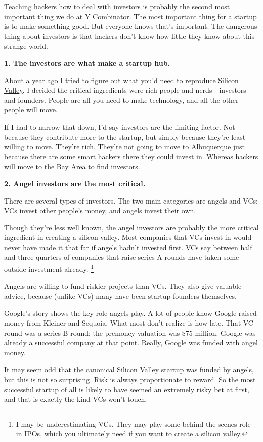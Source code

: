 \documentclass[12pt]{book}
\begin{document}
Teaching hackers how to deal with investors is probably the second most
important thing we do at Y Combinator. The most important thing for a
startup is to make something good. But everyone knows that's important.
The dangerous thing about investors is that hackers don't know how
little they know about this strange world.

\textbf{1. The investors are what make a startup hub.}

About a year ago I tried to figure out what you'd need to reproduce
\href{siliconvalley.html}{Silicon Valley}. I decided the critical
ingredients were rich people and nerds---investors and founders. People
are all you need to make technology, and all the other people will move.

If I had to narrow that down, I'd say investors are the limiting factor.
Not because they contribute more to the startup, but simply because
they're least willing to move. They're rich. They're not going to move
to Albuquerque just because there are some smart hackers there they
could invest in. Whereas hackers will move to the Bay Area to find
investors.

\textbf{2. Angel investors are the most critical.}

There are several types of investors. The two main categories are angels
and VCs: VCs invest other people's money, and angels invest their own.

Though they're less well known, the angel investors are probably the
more critical ingredient in creating a silicon valley. Most companies
that VCs invest in would never have made it that far if angels hadn't
invested first. VCs say between half and three quarters of companies
that raise series A rounds have taken some outside investment already.
\footnote{I may be underestimating VCs. They may play some behind the
scenes role in IPOs, which you ultimately need if you want to create a
silicon valley.}

Angels are willing to fund riskier projects than VCs. They also give
valuable advice, because (unlike VCs) many have been startup founders
themselves.

Google's story shows the key role angels play. A lot of people know
Google raised money from Kleiner and Sequoia. What most don't realize is
how late. That VC round was a series B round; the premoney valuation was
\$75 million. Google was already a successful company at that point.
Really, Google was funded with angel money.

It may seem odd that the canonical Silicon Valley startup was funded by
angels, but this is not so surprising. Risk is always proportionate to
reward. So the most successful startup of all is likely to have seemed
an extremely risky bet at first, and that is exactly the kind VCs won't
touch.
\end{document}
